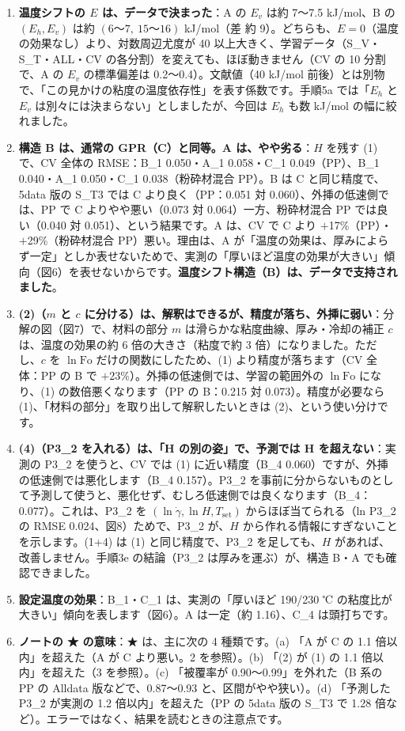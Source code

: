 \documentclass[paper=a4paper,fontsize=10.5pt,line_length=44zw,number_of_lines=38]{jlreq}
\newcommand{\gd}{\dot{\gamma}}
\newcommand{\Tset}{T_{\mathrm{set}}}
\newcommand{\Eh}{E_{h}}
\newcommand{\Ev}{E_{v}}
\begin{document}
\begin{enumerate}[itemsep=0.8ex,topsep=0.6ex]
\item \textbf{温度シフトの $E$ は、データで決まった}：A の $\Ev$ は約 7〜7.5 kJ/mol、B の $(\Eh,\Ev)$ は約 $(6\text{〜}7,\ 15\text{〜}16)$ kJ/mol（差 約 9）。どちらも、$E=0$（温度の効果なし）より、対数周辺尤度が 40 以上大きく、学習データ（S\_V・S\_T・ALL・CV の各分割）を変えても、ほぼ動きません（CV の 10 分割で、A の $\Ev$ の標準偏差は 0.2〜0.4）。文献値（40 kJ/mol 前後）とは別物で、「この見かけの粘度の温度依存性」を表す係数です。手順5a では「$\Eh$ と $\Ev$ は別々には決まらない」としましたが、今回は $\Eh$ も数 kJ/mol の幅に絞れました。
\item \textbf{構造 B は、通常の GPR（C）と同等。A は、やや劣る}：$H$ を残す (1) で、CV 全体の RMSE：B\_1 0.050・A\_1 0.058・C\_1 0.049（PP）、B\_1 0.040・A\_1 0.050・C\_1 0.038（粉砕材混合 PP）。B は C と同じ精度で、5data 版の S\_T3 では C より良く（PP：0.051 対 0.060）、外挿の低速側では、PP で C よりやや悪い（0.073 対 0.064）一方、粉砕材混合 PP では良い（0.040 対 0.051）、という結果です。A は、CV で C より $+$17\%（PP）・$+$29\%（粉砕材混合 PP）悪い。理由は、A が「温度の効果は、厚みによらず一定」としか表せないためで、実測の「厚いほど温度の効果が大きい」傾向（図6）を表せないからです。\textbf{温度シフト構造（B）は、データで支持されました}。
\item \textbf{(2)（$m$ と $c$ に分ける）は、解釈はできるが、精度が落ち、外挿に弱い}：分解の図（図7）で、材料の部分 $m$ は滑らかな粘度曲線、厚み・冷却の補正 $c$ は、温度の効果の約 6 倍の大きさ（粘度で約 3 倍）になりました。ただし、$c$ を $\ln\mathrm{Fo}$ だけの関数にしたため、(1) より精度が落ちます（CV 全体：PP の B で $+$23\%）。外挿の低速側では、学習の範囲外の $\ln\mathrm{Fo}$ になり、(1) の数倍悪くなります（PP の B：0.215 対 0.073）。精度が必要なら (1)、「材料の部分」を取り出して解釈したいときは (2)、という使い分けです。
\item \textbf{(4)（P3\_2 を入れる）は、「H の別の姿」で、予測では H を超えない}：実測の P3\_2 を使うと、CV では (1) に近い精度（B\_4 0.060）ですが、外挿の低速側では悪化します（B\_4 0.157）。P3\_2 を事前に分からないものとして予測して使うと、悪化せず、むしろ低速側では良くなります（B\_4：0.077）。これは、P3\_2 を $(\ln\gd,\ln H,\Tset)$ からほぼ当てられる（ln P3\_2 の RMSE 0.024、図8）ためで、P3\_2 が、$H$ から作れる情報にすぎないことを示します。(1+4) は (1) と同じ精度で、P3\_2 を足しても、$H$ があれば、改善しません。手順3e の結論（P3\_2 は厚みを運ぶ）が、構造 B・A でも確認できました。
\item \textbf{設定温度の効果}：B\_1・C\_1 は、実測の「厚いほど 190/230 ℃ の粘度比が大きい」傾向を表します（図6）。A は一定（約 1.16）、C\_4 は頭打ちです。
\item \textbf{ノートの ★ の意味}：★ は、主に次の 4 種類です。(a) 「A が C の 1.1 倍以内」を超えた（A が C より悪い。2 を参照）。(b) 「(2) が (1) の 1.1 倍以内」を超えた（3 を参照）。(c) 「被覆率が 0.90〜0.99」を外れた（B 系の PP の Alldata 版などで、0.87〜0.93 と、区間がやや狭い）。(d) 「予測した P3\_2 が実測の 1.2 倍以内」を超えた（PP の 5data 版の S\_T3 で 1.28 倍など）。エラーではなく、結果を読むときの注意点です。
\end{enumerate}
\end{document}
